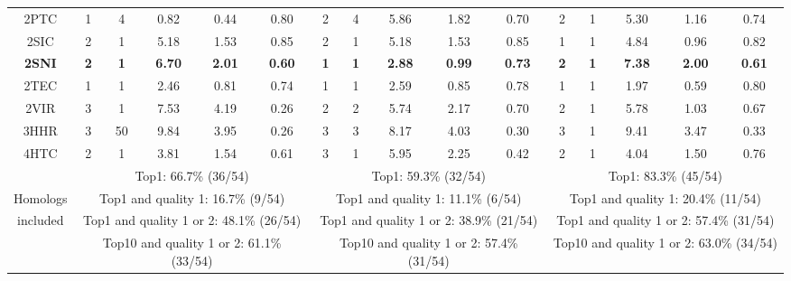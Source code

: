 \begin{longtable}{c c c c c c|c c c c c|c c c c c}
 {\tiny 2PTC}&{\tiny 1}&{\tiny 4}&{\tiny 0.82}&{\tiny 0.44}&{\tiny 0.80}&{\tiny 2}&{\tiny 4}&{\tiny 5.86}&{\tiny 1.82}&{\tiny 0.70}&{\tiny 2}&{\tiny 1}&{\tiny 5.30}&{\tiny 1.16}&{\tiny 0.74}\\ 
 {\tiny 2SIC}&{\tiny 2}&{\tiny 1}&{\tiny 5.18}&{\tiny 1.53}&{\tiny 0.85}&{\tiny 2}&{\tiny 1}&{\tiny 5.18}&{\tiny 1.53}&{\tiny 0.85}&{\tiny 1}&{\tiny 1}&{\tiny 4.84}&{\tiny 0.96}&{\tiny 0.82}\\ 
 \textbf{\tiny 2SNI}&\textbf{\tiny 2}&\textbf{\tiny 1}&\textbf{\tiny 6.70}&\textbf{\tiny 2.01}&\textbf{\tiny 0.60}&\textbf{\tiny 1}&\textbf{\tiny 1}&\textbf{\tiny 2.88}&\textbf{\tiny 0.99}&\textbf{\tiny 0.73}&\textbf{\tiny 2}&\textbf{\tiny 1}&\textbf{\tiny 7.38}&\textbf{\tiny 2.00}&\textbf{\tiny 0.61}\\ 
 {\tiny 2TEC}&{\tiny 1}&{\tiny 1}&{\tiny 2.46}&{\tiny 0.81}&{\tiny 0.74}&{\tiny 1}&{\tiny 1}&{\tiny 2.59}&{\tiny 0.85}&{\tiny 0.78}&{\tiny 1}&{\tiny 1}&{\tiny 1.97}&{\tiny 0.59}&{\tiny 0.80}\\ 
 {\tiny 2VIR}&{\tiny 3}&{\tiny 1}&{\tiny 7.53}&{\tiny 4.19}&{\tiny 0.26}&{\tiny 2}&{\tiny 2}&{\tiny 5.74}&{\tiny 2.17}&{\tiny 0.70}&{\tiny 2}&{\tiny 1}&{\tiny 5.78}&{\tiny 1.03}&{\tiny 0.67}\\ 
 {\tiny 3HHR}&{\tiny 3}&{\tiny 50}&{\tiny 9.84}&{\tiny 3.95}&{\tiny 0.26}&{\tiny 3}&{\tiny 3}&{\tiny 8.17}&{\tiny 4.03}&{\tiny 0.30}&{\tiny 3}&{\tiny 1}&{\tiny 9.41}&{\tiny 3.47}&{\tiny 0.33}\\ 
 {\tiny 4HTC}&{\tiny 2}&{\tiny 1}&{\tiny 3.81}&{\tiny 1.54}&{\tiny 0.61}&{\tiny 3}&{\tiny 1}&{\tiny 5.95}&{\tiny 2.25}&{\tiny 0.42}&{\tiny 2}&{\tiny 1}&{\tiny 4.04}&{\tiny 1.50}&{\tiny 0.76}\\ 
 \hline
& \multicolumn{5}{c}{\tiny Top1: 66.7\% (36/54)} & \multicolumn{5}{c}{\tiny Top1: 59.3\% (32/54)} & \multicolumn{5}{c}{\tiny Top1: 83.3\% (45/54)}  \\ 
 {\tiny Homologs}& \multicolumn{5}{c}{\tiny Top1 and quality 1: 16.7\% (9/54)} & \multicolumn{5}{c}{\tiny Top1 and quality 1: 11.1\% (6/54)} & \multicolumn{5}{c}{\tiny Top1 and quality 1: 20.4\% (11/54)}  \\ 
 {\tiny included}& \multicolumn{5}{c}{\tiny Top1 and quality 1 or 2: 48.1\% (26/54)} & \multicolumn{5}{c}{\tiny Top1 and quality 1 or 2: 38.9\% (21/54)} & \multicolumn{5}{c}{\tiny Top1 and quality 1 or 2: 57.4\% (31/54)}  \\ 
 & \multicolumn{5}{c}{\tiny Top10 and quality 1 or 2: 61.1\% (33/54)} & \multicolumn{5}{c}{\tiny Top10 and quality 1 or 2: 57.4\% (31/54)} & \multicolumn{5}{c}{\tiny Top10 and quality 1 or 2: 63.0\% (34/54)}  \\ 

\end{longtable}
